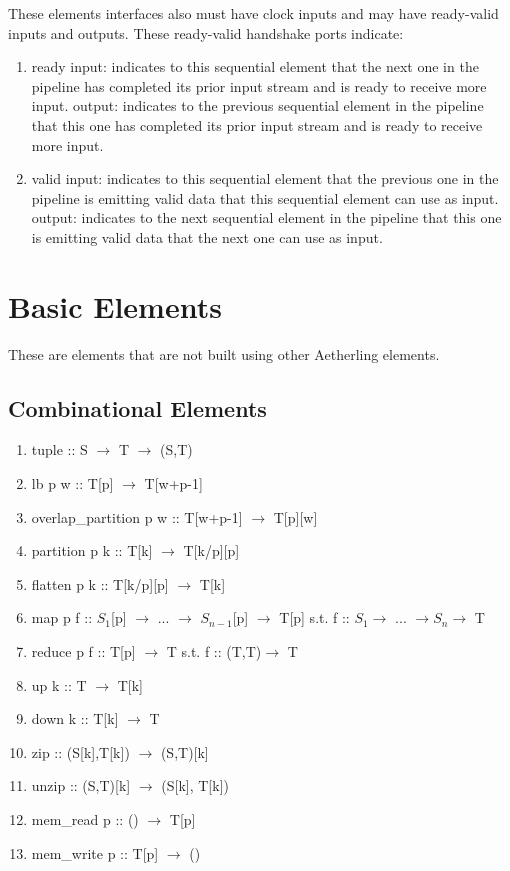 \documentclass[11pt,fleqn]{article}
\numberwithin{equation}{subsection}
\begin{document}
These elements interfaces also must have clock inputs and may have ready-valid 
inputs and outputs. These ready-valid handshake ports indicate:
\begin{enumerate}
        \item ready
            \subitem input: indicates to this sequential element that the next 
            one in the pipeline has completed its prior input stream and is 
            ready to receive more input.
            \subitem output: indicates to the previous sequential element in the 
            pipeline that this one has completed its prior input stream and is
            ready to receive more input.
        \item valid
            \subitem input: indicates to this sequential element that the previous
            one in the pipeline is emitting valid data that this sequential 
            element can use as input.
            \subitem output: indicates to the next sequential element in the
            pipeline that this one is emitting valid data that the next one
            can use as input.
\end{enumerate}

\section{Basic Elements}
These are elements that are not built using other Aetherling elements.

\subsection{Combinational Elements}

\begin{enumerate}
    \item tuple :: S $\rightarrow$ T $\rightarrow$ (S,T)
    \item lb p w :: T[p] $\rightarrow$ T[w+p-1]
    \item overlap\_partition p w :: T[w+p-1] $\rightarrow$ T[p][w]
    \item partition p k :: T[k] $\rightarrow$ T[k/p][p]
    \item flatten p k :: T[k/p][p] $\rightarrow$ T[k]
    \item map p f :: $S_1$[p] $\rightarrow$ ... $\rightarrow$ $S_{n-1}$[p] $\rightarrow$ 
        T[p]
        \subitem s.t. f :: $S_1 \rightarrow$ ... $\rightarrow S_n \rightarrow$ T 
    \item reduce p f :: T[p] $\rightarrow$ T
        \subitem s.t. f :: (T,T)$\rightarrow$ T
    \item up k :: T $\rightarrow$ T[k]
    \item down k :: T[k] $\rightarrow$ T
    \item zip :: (S[k],T[k]) $\rightarrow$ (S,T)[k]
    \item unzip :: (S,T)[k] $\rightarrow$ (S[k], T[k])
    \item mem\_read p :: () $\rightarrow$ T[p]
    \item mem\_write p :: T[p] $\rightarrow$ ()
\end{enumerate}
\end{document}
